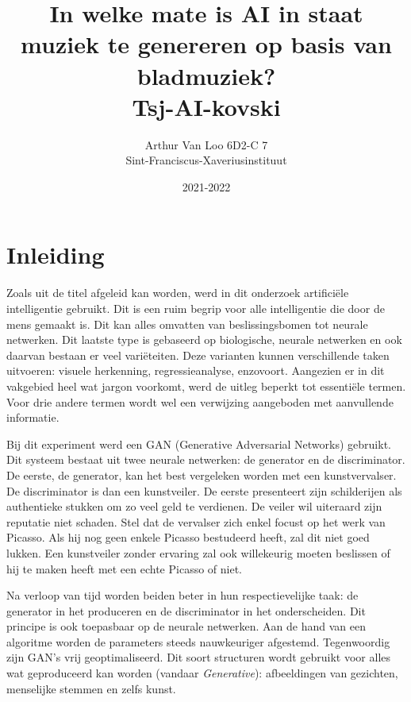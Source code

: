 \documentclass[dutch, twoside, a4paper, 10pt]{article}
\title{\vspace{75mm}In welke mate is AI in staat muziek te genereren op basis van bladmuziek? \\[1ex] \large Tsj-AI-kovski }
\author{\small Arthur Van Loo 6D2-C 7\\ \small Sint-Franciscus-Xaveriusinstituut}
\date{ \vspace{-5mm} \small 2021-2022}
\begin{document}
\LARGE \maketitle
\thispagestyle{empty}
\newpage
\mbox{}
\newpage
\normalsize

\tableofcontents

\newpage

\section{Inleiding}
\noindent
Zoals uit de titel afgeleid kan worden, werd in dit onderzoek artificiële intelligentie gebruikt. Dit is een ruim begrip voor alle intelligentie die door de mens gemaakt is. Dit kan alles omvatten van beslissingsbomen tot neurale netwerken. Dit laatste type is gebaseerd op biologische, neurale netwerken en ook daarvan bestaan er veel variëteiten. Deze varianten kunnen verschillende taken uitvoeren: visuele herkenning, regressieanalyse, enzovoort. Aangezien er in dit vakgebied heel wat jargon voorkomt, werd de uitleg beperkt tot essentiële termen. Voor drie andere termen wordt wel een verwijzing aangeboden met aanvullende informatie.
\par\bigskip\noindent
Bij dit experiment werd een GAN (Generative Adversarial Networks) gebruikt. Dit systeem bestaat uit twee neurale netwerken: de generator en de discriminator. De eerste, de generator, kan het best vergeleken worden met een kunstvervalser. De discriminator is dan een kunstveiler.  De eerste presenteert zijn schilderijen als authentieke stukken om zo veel geld te verdienen. De veiler wil uiteraard zijn reputatie niet schaden. Stel dat de vervalser zich enkel focust op het werk van Picasso. Als hij nog geen enkele Picasso bestudeerd heeft, zal dit niet goed lukken. Een kunstveiler zonder ervaring zal ook willekeurig moeten beslissen of hij te maken heeft met een echte Picasso of niet. 
\par\bigskip\noindent
Na verloop van tijd worden beiden beter in hun respectievelijke taak: de generator in het produceren en de discriminator in het onderscheiden. Dit principe is ook toepasbaar op de neurale netwerken. Aan de hand van een algoritme worden de parameters steeds nauwkeuriger afgestemd. Tegenwoordig zijn GAN's vrij geoptimaliseerd. Dit soort structuren wordt gebruikt voor alles wat geproduceerd kan worden (vandaar \textit{Generative}): afbeeldingen van gezichten, menselijke stemmen en zelfs kunst.
\end{document}
